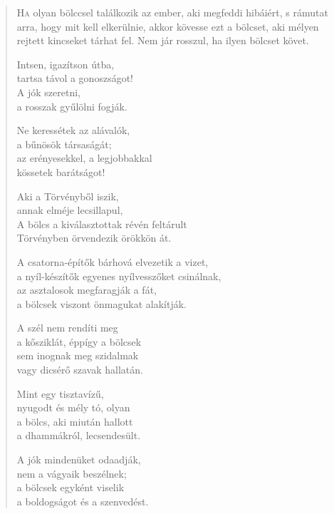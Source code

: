 
\vspace*{-2\baselineskip}
\begin{verse}

{\par%
\lettrine{H}{a} {\LettrineTextFont olyan bölccsel találkozik}\newline
az ember, aki megfeddi hibáiért,\newline
s rámutat arra, hogy mit kell elkerülnie,\verselinebreak
akkor kövesse ezt a bölcset,\verselinebreak
aki mélyen rejtett kincseket tárhat fel.\verselinebreak
Nem jár rosszul, ha ilyen bölcset követ.
\par}

 Intsen, igazítson útba,\\
tartsa távol a gonoszságot!\\
A jók szeretni,\\
a rosszak gyűlölni fogják.

 Ne keressétek az alávalók,\\
a bűnösök társaságát;\\
az erényesekkel, a legjobbakkal\\
kössetek barátságot!

 Aki a Törvényből iszik,\\
annak elméje lecsillapul,\\
A bölcs a kiválasztottak révén feltárult\\
Törvényben örvendezik örökkön át.

 A csatorna-építők bárhová elvezetik a vizet,\\
a nyíl-készítők egyenes nyílvesszőket csinálnak,\\
az asztalosok megfaragják a fát,\\
a bölcsek viszont önmagukat alakítják.

 A szél nem rendíti meg\\
a kősziklát, éppígy a bölcsek\\
sem inognak meg szidalmak\\
vagy dicsérő szavak hallatán.

 Mint egy tisztavízű,\\
nyugodt és mély tó, olyan\\
a bölcs, aki miután hallott\\
a dhammákról, lecsendesült.

 A jók mindenüket odaadják,\\
nem a vágyaik beszélnek;\\
a bölcsek egyként viselik\\
a boldogságot és a szenvedést.


\end{verse}
